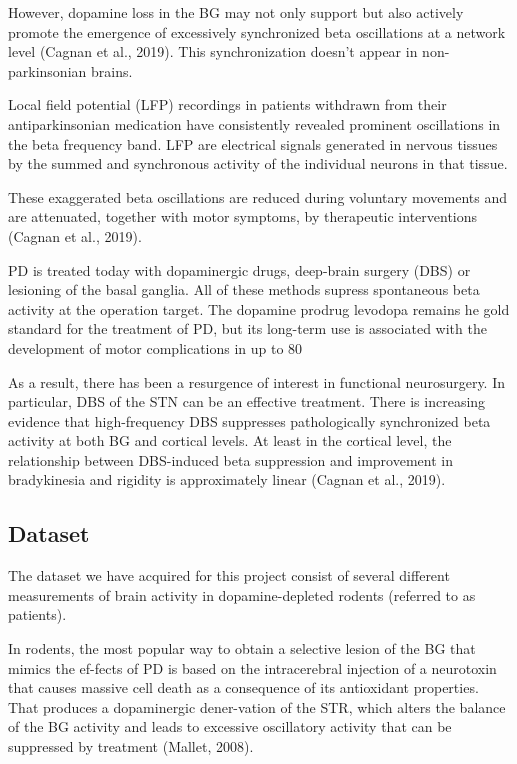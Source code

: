 \documentclass{article}
\begin{document}
However, dopamine loss in the BG may not only support but also actively promote the emergence of excessively synchronized beta oscillations at a network level (Cagnan et al., 2019). This synchronization doesn’t appear in non-parkinsonian brains.

Local field potential (LFP) recordings in patients withdrawn from their antiparkinsonian medication have consistently revealed prominent oscillations in the beta frequency band. LFP are electrical signals generated in nervous tissues by the summed and synchronous activity of the individual neurons in that tissue.

These exaggerated beta oscillations are reduced during voluntary movements and are attenuated, together with motor symptoms, by therapeutic interventions (Cagnan et al., 2019). 

PD is treated today with dopaminergic drugs, deep-brain surgery (DBS) or lesioning of the basal ganglia. All of these methods supress spontaneous beta activity at the operation target. The dopamine prodrug levodopa remains he gold standard for the treatment of PD, but its long-term use is associated with the development of motor complications in up to 80%

As a result, there has been a resurgence of interest in functional neurosurgery. In particular, DBS of the STN can be an effective treatment. There is increasing evidence that high-frequency DBS suppresses pathologically synchronized beta activity at both BG and cortical levels. At least in the cortical level, the relationship between DBS-induced beta suppression and improvement in bradykinesia and rigidity is approximately linear (Cagnan et al., 2019). 


\subsection{Dataset}
The dataset we have acquired for this project consist of several different measurements of brain activity in dopamine-depleted rodents (referred to as patients). 

In rodents, the most popular way to obtain a selective lesion of the BG that mimics the ef-fects of PD is based on the intracerebral injection of a neurotoxin that causes massive cell death as a consequence of its antioxidant properties. That produces a dopaminergic dener-vation of the STR, which alters the balance of the BG activity and leads to excessive oscillatory activity that can be suppressed by treatment (Mallet, 2008).
\end{document}
